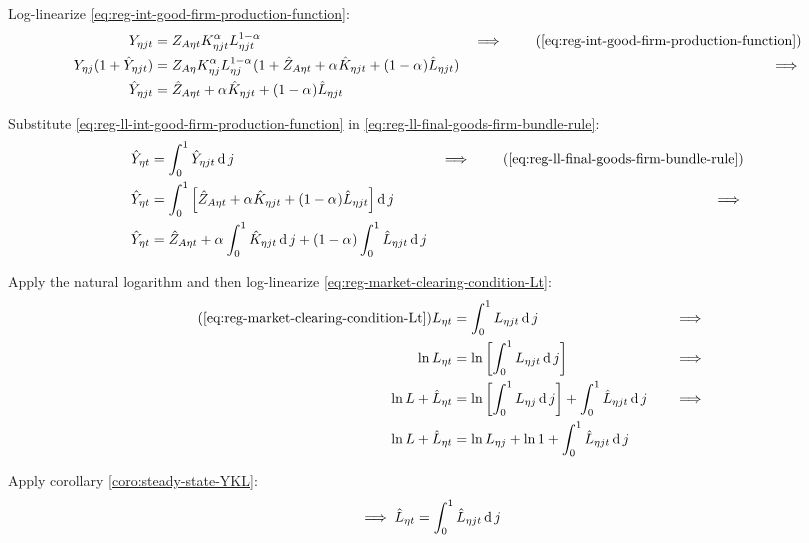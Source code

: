 \documentclass[../thesis.tex]{subfiles}
\begin{document}
Log-linearize \ref{eq:reg-int-good-firm-production-function}:
\begin{alignat}{2}
	Y_{\eta jt} &= Z_{A\eta t} K_{\eta jt}^{\alpha_{}} L_{\eta jt}^{1-{\alpha_{}}} &\implies \tag{\ref{eq:reg-int-good-firm-production-function}} \\
	Y_{\eta j} (1+ \hat{Y}_{\eta jt}) &= Z_{A\eta} K_{\eta j}^{\alpha_{}} L_{\eta j}^{1-{\alpha_{}}} (1+ \hat{Z}_{A\eta t} + {\alpha_{}} \hat{K}_{\eta jt} + (1-{\alpha_{}}) \hat{L}_{\eta jt}) &\implies \nonumber \\
	\hat{Y}_{\eta jt} &= \hat{Z}_{A\eta t} + {\alpha_{}} \hat{K}_{\eta jt} + (1-{\alpha_{}}) \hat{L}_{\eta jt} \label{eq:reg-ll-int-good-firm-production-function}
\end{alignat}

Substitute \ref{eq:reg-ll-int-good-firm-production-function} in \ref{eq:reg-ll-final-goods-firm-bundle-rule}:
\begin{alignat}{2}
	\hat{Y}_{\eta t} &= \int_{0}^{1} \hat{Y}_{\eta jt} \dif j &\implies \tag{\ref{eq:reg-ll-final-goods-firm-bundle-rule}} \\
	\hat{Y}_{\eta t} &= \int_{0}^{1} \left[ \hat{Z}_{A\eta t} + {\alpha_{}} \hat{K}_{\eta jt} + (1-{\alpha_{}}) \hat{L}_{\eta jt} \right] \dif j &\implies \nonumber \\
	\hat{Y}_{\eta t} &= \hat{Z}_{A\eta t} + {\alpha_{}} \int_{0}^{1} \hat{K}_{\eta jt} \dif j + (1-{\alpha_{}}) \int_{0}^{1} \hat{L}_{\eta jt} \dif j \label{eq:reg-ll-final-goods-firm-bundle-rule-2}
\end{alignat}

Apply the natural logarithm and then log-linearize \ref{eq:reg-market-clearing-condition-Lt}:
\begin{alignat}{2}
	\tag{\ref{eq:reg-market-clearing-condition-Lt}}
	L_{\eta t} &= \int_{0}^{1} L_{\eta jt} \dif j &\implies \\
	\ln L_{\eta t} &= \ln \left[ \int_{0}^{1} L_{\eta jt} \dif j \right] &\implies \nonumber \\
	\ln L + \hat{L}_{\eta t} &= \ln \left[ \int_{0}^{1} L_{\eta j} \dif j \right] + \int_{0}^{1} \hat{L}_{\eta jt} \dif j \quad &\implies \nonumber \\
	\ln L + \hat{L}_{\eta t} &= \ln L_{\eta j} + \ln 1 + \int_{0}^{1} \hat{L}_{\eta jt} \dif j \nonumber
\end{alignat}

Apply corollary \ref{coro:steady-state-YKL}:
\begin{align}
	\implies \hat{L}_{\eta t} &= \int_{0}^{1} \hat{L}_{\eta jt} \operatorname{d} j \label{eq:reg-ll-market-clearing-condition-Lt}
\end{align}
\end{document}
